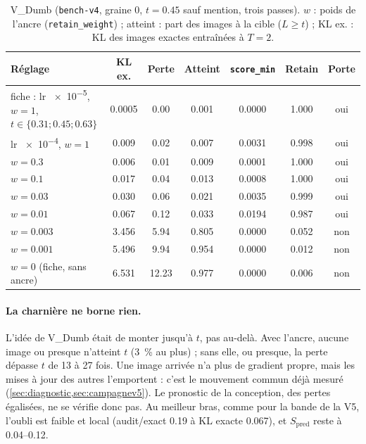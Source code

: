 \documentclass[11pt,a4paper]{article}
\newcommand{\code}[1]{\texttt{#1}}
\begin{document}
\begin{table}[ht]
  \centering\small
  \caption{V\_Dumb (\code{bench-v4}, graine 0, $t=\num{0.45}$ sauf mention, trois passes). $w$ : poids
  de l'ancre (\code{retain\_weight}) ; atteint : part des images à la cible ($L\ge t$) ; KL ex. : KL
  des images exactes entraînées à $T=2$.}\label{tab:vdumb}
  \setlength{\tabcolsep}{3.5pt}
  \begin{tabular}{@{}l S[table-format=1.4] S[table-format=2.2] S[table-format=1.3] S[table-format=1.4] S c@{}}
    \toprule
    Réglage & {KL ex.} & {Perte} & {Atteint} & {\code{score\_min}} & {Retain} & Porte\\
    \midrule
    fiche : lr \num{e-5}, $w=1$, $t\in\{\num{0.31};\num{0.45};\num{0.63}\}$ & 0.0005 & 0.00 & 0.001 & 0.0000 & 1.000 & oui\\
    lr \num{e-4}, $w=1$ & 0.009 & 0.02 & 0.007 & 0.0031 & 0.998 & oui\\
    $w=\num{0.3}$ & 0.006 & 0.01 & 0.009 & 0.0001 & 1.000 & oui\\
    $w=\num{0.1}$ & 0.017 & 0.04 & 0.013 & 0.0008 & 1.000 & oui\\
    $w=\num{0.03}$ & 0.030 & 0.06 & 0.021 & 0.0035 & 0.999 & oui\\
    $w=\num{0.01}$ & 0.067 & 0.12 & 0.033 & 0.0194 & 0.987 & oui\\
    $w=\num{0.003}$ & 3.456 & 5.94 & 0.805 & 0.0000 & 0.052 & non\\
    $w=\num{0.001}$ & 5.496 & 9.94 & 0.954 & 0.0000 & 0.012 & non\\
    $w=0$ (fiche, sans ancre) & 6.531 & 12.23 & 0.977 & 0.0000 & 0.006 & non\\
    \bottomrule
  \end{tabular}
\end{table}

\paragraph{La charnière ne borne rien.} L'idée de V\_Dumb était de monter jusqu'à $t$, pas au-delà.
Avec l'ancre, aucune image ou presque n'atteint $t$ (\SI{3}{\percent} au plus) ; sans elle, ou presque,
la perte dépasse $t$ de 13 à 27 fois. Une image arrivée n'a plus de gradient propre, mais les mises à
jour des autres l'emportent : c'est le mouvement commun déjà mesuré (\cref{sec:diagnostic,sec:campagnev5}).
Le pronostic de la conception, des pertes égalisées, ne se vérifie donc pas. Au meilleur bras, comme pour
la bande de la V5, l'oubli est faible et local (audit/exact \num{0.19} à KL exacte \num{0.067}), et
$S_{\text{pred}}$ reste à \numrange{0.04}{0.12}.
\end{document}
